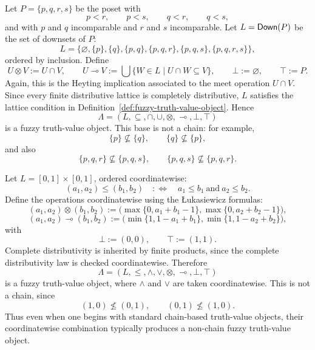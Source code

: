 \begin{example}
\label{ex:seven-element-nonchain-truth-value-algebra}
    Let \(P=\{p,q,r,s\}\) be the poset with
    \[
        p<r,\qquad p<s,\qquad q<r,\qquad q<s,
    \]
    and with \(p\) and \(q\) incomparable and \(r\) and \(s\) incomparable. Let \(L=\mathsf{Down}(P)\) be the set of downsets of \(P\):
    \[
        L=
        \bigl\{
            \varnothing,\{p\},\{q\},\{p,q\},
            \{p,q,r\},\{p,q,s\},\{p,q,r,s\}
        \bigr\},
    \]
    ordered by inclusion. Define
    \[
        U\otimes V:=U\cap V,
        \qquad
        U\multimap V:=\bigcup\{W\in L\mid U\cap W\subseteq V\},
        \qquad
        \bot:=\varnothing,
        \qquad
        \top:=P.
    \]
    Again, this is the Heyting implication associated to the meet operation \(U\cap V\). Since every finite distributive lattice is completely distributive, \(L\) satisfies the lattice condition in Definition~\ref{def:fuzzy-truth-value-object}. Hence
    \[
        \Lambda=(L,\subseteq,\cap,\cup,\otimes,\multimap,\bot,\top)
    \]
    is a fuzzy truth-value object. This base is not a chain: for example,
    \[
        \{p\}\not\subseteq \{q\},
        \qquad
        \{q\}\not\subseteq \{p\},
    \]
    and also
    \[
        \{p,q,r\}\not\subseteq \{p,q,s\},
        \qquad
        \{p,q,s\}\not\subseteq \{p,q,r\}.
    \]
\end{example}

\begin{example}
\label{ex:coordinatewise-product-truth-value-algebra}
    Let \(L=[0,1]\times [0,1]\), ordered coordinatewise:
    \[
        (a_1,a_2)\leq (b_1,b_2)
        \quad:\Longleftrightarrow\quad
        a_1\leq b_1
        \ \text{and}\
        a_2\leq b_2.
    \]
    Define the operations coordinatewise using the {\L}ukasiewicz formulas:
    \[
        (a_1,a_2)\otimes (b_1,b_2)
        :=
        \bigl(
        \max\{0,a_1+b_1-1\},
        \max\{0,a_2+b_2-1\}
        \bigr),
    \]
    \[
        (a_1,a_2)\multimap (b_1,b_2)
        :=
        \bigl(
            \min\{1,1-a_1+b_1\},
            \min\{1,1-a_2+b_2\}
        \bigr),
    \]
    with
    \[
        \bot:=(0,0),
        \qquad
        \top:=(1,1).
    \]
    Complete distributivity is inherited by finite products, since the complete distributivity law is checked coordinatewise. Therefore
    \[
        \Lambda=(L,\leq,\wedge,\vee,\otimes,\multimap,\bot,\top)
    \]
    is a fuzzy truth-value object, where \(\wedge\) and \(\vee\) are taken coordinatewise. This is not a chain, since
    \[
        (1,0)\nleq (0,1),
        \qquad
        (0,1)\nleq (1,0).
    \]
    Thus even when one begins with standard chain-based truth-value objects, their coordinatewise combination typically produces a non-chain fuzzy truth-value object.
\end{example}

